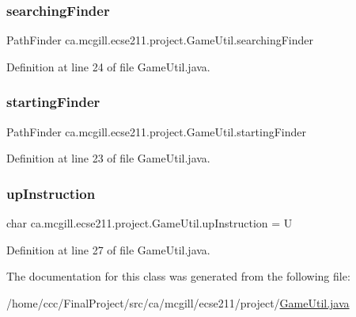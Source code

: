 \subsubsection{\texorpdfstring{searching\+Finder}{searchingFinder}}
{\footnotesize\ttfamily Path\+Finder ca.\+mcgill.\+ecse211.\+project.\+Game\+Util.\+searching\+Finder\hspace{0.3cm}{\ttfamily [static]}}



Definition at line 24 of file Game\+Util.\+java.

\mbox{\label{classca_1_1mcgill_1_1ecse211_1_1project_1_1_game_util_a84ec23eabf60cb20895815e7b390e3f2}} 
\subsubsection{\texorpdfstring{starting\+Finder}{startingFinder}}
{\footnotesize\ttfamily Path\+Finder ca.\+mcgill.\+ecse211.\+project.\+Game\+Util.\+starting\+Finder\hspace{0.3cm}{\ttfamily [static]}}



Definition at line 23 of file Game\+Util.\+java.

\mbox{\label{classca_1_1mcgill_1_1ecse211_1_1project_1_1_game_util_a98831b92dc6ed43627755d2995cba683}} 
\subsubsection{\texorpdfstring{up\+Instruction}{upInstruction}}
{\footnotesize\ttfamily char ca.\+mcgill.\+ecse211.\+project.\+Game\+Util.\+up\+Instruction = \textquotesingle{}U\textquotesingle{}\hspace{0.3cm}{\ttfamily [static]}}



Definition at line 27 of file Game\+Util.\+java.



The documentation for this class was generated from the following file\+:\begin{DoxyCompactItemize}
\item 
/home/ccc/\+Final\+Project/src/ca/mcgill/ecse211/project/\hyperlink{_game_util_8java}{Game\+Util.\+java}\end{DoxyCompactItemize}
